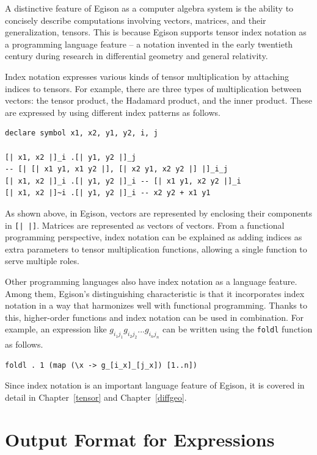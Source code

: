 A distinctive feature of Egison as a computer algebra system is the ability to concisely describe computations involving vectors, matrices, and their generalization, tensors.
This is because Egison supports tensor index notation as a programming language feature -- a notation invented in the early twentieth century during research in differential geometry and general relativity.

Index notation expresses various kinds of tensor multiplication by attaching indices to tensors.
For example, there are three types of multiplication between vectors: the tensor product, the Hadamard product, and the inner product. These are expressed by using different index patterns as follows.
\begin{lstlisting}[language=egison,numbers=none]
declare symbol x1, x2, y1, y2, i, j

[| x1, x2 |]_i .[| y1, y2 |]_j
-- [| [| x1 y1, x1 y2 |], [| x2 y1, x2 y2 |] |]_i_j
[| x1, x2 |]_i .[| y1, y2 |]_i -- [| x1 y1, x2 y2 |]_i
[| x1, x2 |]~i .[| y1, y2 |]_i -- x2 y2 + x1 y1
\end{lstlisting}
As shown above, in Egison, vectors are represented by enclosing their components in \lstinline{[| |]}.
Matrices are represented as vectors of vectors.
From a functional programming perspective, index notation can be explained as adding indices as extra parameters to tensor multiplication functions, allowing a single function to serve multiple roles.

Other programming languages also have index notation as a language feature.
Among them, Egison's distinguishing characteristic is that it incorporates index notation in a way that harmonizes well with functional programming.
Thanks to this, higher-order functions and index notation can be used in combination.
For example, an expression like $g_{i_{1}j_{1}} g_{i_{2}j_{2}} ... g_{i_{n}j_{n}}$ can be written using the \lstinline{foldl} function as follows.
\begin{lstlisting}[language=egison,numbers=none]
foldl . 1 (map (\x -> g_[i_x]_[j_x]) [1..n])
\end{lstlisting}

Since index notation is an important language feature of Egison, it is covered in detail in Chapter~\ref{tensor} and Chapter~\ref{diffgeo}.

\section{Output Format for Expressions}

